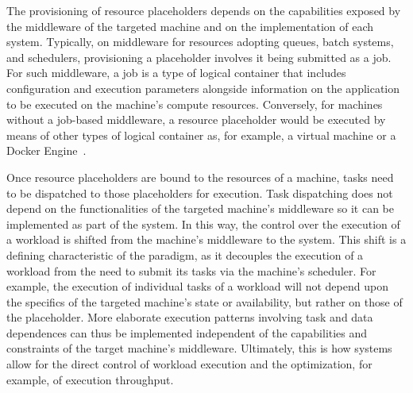\documentclass{sig-alternate}
\begin{document}
The provisioning of resource placeholders depends on the capabilities exposed by
the middleware of the targeted machine and on the implementation of each \pilot
system. Typically, on middleware for resources adopting queues, batch systems,
and schedulers, provisioning a placeholder involves it being submitted as a
job. For such middleware, a job is a type of logical container that includes
configuration and execution parameters alongside information on the application
to be executed on the machine's compute resources. Conversely, for machines
without a job-based middleware, a resource placeholder would be executed by
means of other types of logical container as, for example, a virtual machine or
a Docker Engine~\cite{bernstein2014,felter2014}.


Once resource placeholders are bound to the resources of a machine, tasks need
to be dispatched to those placeholders for execution. Task dispatching does not
depend on the functionalities of the targeted machine's middleware so it can be
implemented as part of the \pilotjob system. In this way, the control over the
execution of a workload is shifted from the machine's middleware to the \pilot
system. This shift is a defining characteristic of the \pilot paradigm, as it
decouples the execution of a workload from the need to submit its tasks via the
machine's scheduler. For example, the execution of individual tasks of a
workload will not depend upon the specifics of the targeted machine's state or
availability, but rather on those of the placeholder. More elaborate execution
patterns involving task and data dependences can thus be implemented independent
of the capabilities and constraints of the target machine's middleware.
Ultimately, this is how \pilotjob systems allow for the direct control of
workload execution and the optimization, for example, of execution throughput.


\end{document}
